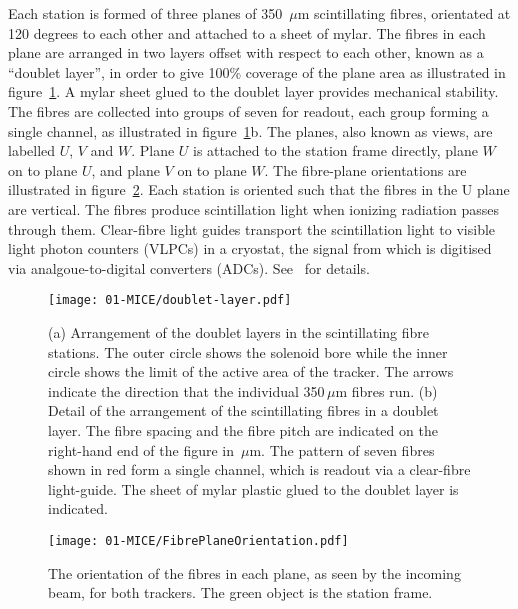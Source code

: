   Each station is formed of three planes of 350~$\mu$m scintillating fibres, orientated at 120 degrees to each other and attached to a sheet of mylar. The fibres in each plane are arranged in two layers offset with respect to each other, known as a ``doublet layer'', in order to give 100$\%$ coverage of the plane area as illustrated in figure~\ref{fig:DoubletLayer}. A mylar sheet glued to the doublet layer provides mechanical stability. The fibres are collected into groups of seven for readout, each group forming a single channel, as illustrated in figure~\ref{fig:DoubletLayer}b. The planes, also known as views, are labelled $U$, $V$ and $W$. Plane $U$ is attached to the station frame directly, plane $W$ on to plane $U$, and plane $V$ on to plane $W$. The fibre-plane orientations are illustrated in figure~\ref{fig:FibrePlaneOrientation}. Each station is oriented such that the fibres in the U plane are vertical. The fibres produce scintillation light when ionizing radiation passes through them. Clear-fibre light guides transport the scintillation light to visible light photon counters (VLPCs) in a cryostat, the signal from which is digitised via analgoue-to-digital converters (ADCs). See~\cite{MiceTrackers} for details.

  \begin{figure}[tbh]
    \begin{center}
      \texttt{[image: 01-MICE/doublet-layer.pdf]}
      \caption{\label{fig:DoubletLayer}(a) Arrangement of the doublet layers in the scintillating fibre  stations. The outer circle shows the solenoid bore while the inner circle shows the limit of the active area of the tracker. The arrows indicate the direction that the individual 350\,$\mu$m fibres run. (b) Detail of the arrangement of the scintillating fibres in a doublet layer. The fibre spacing and the fibre pitch are indicated on the right-hand end of the figure in \,$\mu$m. The pattern of seven fibres shown in red form a single channel, which is readout via a clear-fibre light-guide. The sheet of mylar plastic glued to the doublet layer is indicated. }
    \end{center}
  \end{figure}

  \begin{figure}[tbh]
    \centering
    \texttt{[image: 01-MICE/FibrePlaneOrientation.pdf]} \hspace{2pc}%
    \caption{\label{fig:FibrePlaneOrientation} The orientation of the fibres in each plane, as seen by the incoming beam, for both trackers. The green object is the station frame.}
  \end{figure}